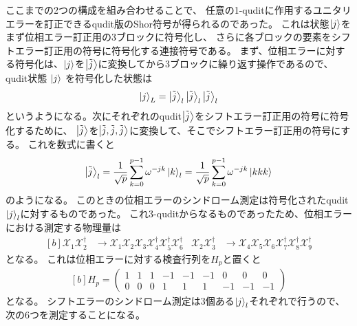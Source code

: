 \documentclass[../master.tex]{subfiles}
\begin{document}
ここまでの2つの構成を組み合わせることで、
任意の1-quditに作用するユニタリエラーを訂正できるqudit版のShor符号が得られるのであった。
これは状態$\ket{j}$をまず位相エラー訂正用の3ブロックに符号化し、
さらに各ブロックの要素をシフトエラー訂正用の符号に符号化する連接符号である。
まず、位相エラーに対する符号化は、$\ket{j}$を$\ket{\tilde{j}}$に変換してから3ブロックに繰り返す操作であるので、
qudit状態 $\ket{j}$ を符号化した状態は
\begin{equation}\begin{aligned}[b]
    \ket{j}_L = \ket{\tilde{j}}_l \ket{\tilde{j}}_l \ket{\tilde{j}}_l
\end{aligned}\end{equation}
というようになる。次にそれぞれのqudit$\ket{\tilde{j}}$をシフトエラー訂正用の符号に符号化するために、
$\ket{\tilde{j}}$を$\ket{\tilde{j}, \tilde{j}, \tilde{j}}$に変換して、そこでシフトエラー訂正用の符号にする。
これを数式に書くと
\begin{equation}\begin{aligned}[b]
    \ket{\tilde{j}}_l = \frac{1}{\sqrt{p}}\sum_{k=0}^{p-1} \omega^{-jk} \ket{k}_l
     = \frac{1}{\sqrt{p}}\sum_{k=0}^{p-1} \omega^{-jk}\ket{kkk}
\end{aligned}\end{equation}
のようになる。
このときの位相エラーのシンドローム測定は符号化されたqudit$\ket{j}_l$に対するものであった。
これ3-quditからなるものであったため、位相エラーにおける測定する物理量は
\begin{equation}\begin{aligned}[b]
    \mathcal{X}_1\mathcal{X}_2^\dagger &\to \mathcal{X}_1\mathcal{X}_2\mathcal{X}_3 \mathcal{X}_4^\dagger\mathcal{X}_5^\dagger\mathcal{X}_6^\dagger &
    \mathcal{X}_2\mathcal{X}_3^\dagger &\to \mathcal{X}_4\mathcal{X}_5\mathcal{X}_6 \mathcal{X}_7^\dagger\mathcal{X}_8^\dagger\mathcal{X}_9^\dagger
\end{aligned}\end{equation}
となる。
これは位相エラーに対する検査行列を$H_p$と置くと
\begin{equation}\begin{aligned}[b]
    H_p = \begin{pmatrix}
        1 & 1 & 1 & -1 & -1 & -1 & 0 & 0 & 0\\
        0 & 0 & 0 & 1 & 1 & 1 & -1 & -1 & -1
    \end{pmatrix}
    \label{eq:chap2_H_phase}
\end{aligned}\end{equation}
となる。
シフトエラーのシンドローム測定は3個ある$\ket{j}_l$それぞれで行うので、次の6つを測定することになる。
\end{document}
